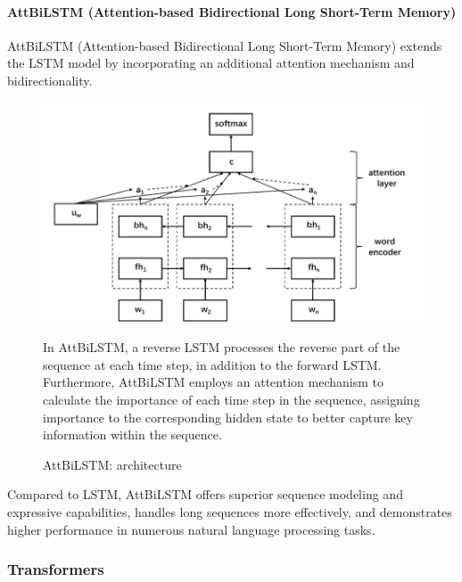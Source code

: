 \documentclass[a4paper]{article}
\begin{document}
\paragraph{AttBiLSTM (Attention-based Bidirectional Long Short-Term Memory)}

AttBiLSTM (Attention-based Bidirectional Long Short-Term Memory) extends the LSTM model by incorporating an additional attention mechanism and bidirectionality.

\begin{figure}[H]
    \centering
    \begin{minipage}{0.48\textwidth}
        \centering
        \includegraphics[width=1\textwidth]{./images/AttBiLSTM_architecture.png}
        \caption{AttBiLSTM:  architecture \cite{ref_rnn2}}
        \label{fig.AttBiLSTM}
    \end{minipage}\hfill
    \begin{minipage}{0.48\textwidth}
        In AttBiLSTM, a reverse LSTM processes the reverse part of the sequence at each time step, in addition to the forward LSTM. Furthermore, AttBiLSTM employs an attention mechanism to calculate the importance of each time step in the sequence, assigning importance to the corresponding hidden state to better capture key information within the sequence.
    \end{minipage}
\end{figure}

Compared to LSTM, AttBiLSTM offers superior sequence modeling and expressive capabilities, handles long sequences more effectively, and demonstrates higher performance in numerous natural language processing tasks.

\subsubsection{Transformers}
\end{document}
